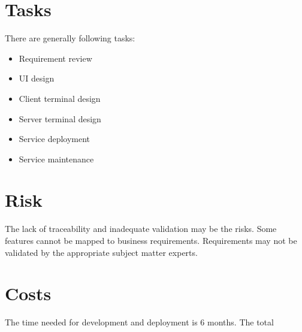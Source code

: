 \documentclass{scrreprt}
\begin{document}
\section{Tasks}
There are generally following tasks:
\begin{itemize}
    \item Requirement review
    \item UI design
    \item Client terminal design
    \item Server terminal design
    \item Service deployment
    \item Service maintenance
\end{itemize}
\section{Risk}
The lack of traceability and inadequate validation may be the risks. Some features cannot be mapped to business requirements. Requirements may not be validated by the appropriate subject matter experts.

\section{Costs}
The time needed for development and deployment is 6 months. The total 
\end{document}
